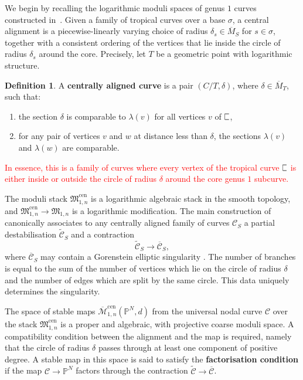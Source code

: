 \documentclass[11pt]{amsart}
\newcommand{\plC}{\scalebox{0.8}[1.3]{$\sqsubset$}}
\newcommand{\tred}{\textcolor{red}}
\renewcommand{\to}{\rightarrow}
\theoremstyle{definition}
\theoremstyle{definition}
\newtheorem{definition}[thm]{Definition}
\begin{document}
We begin by recalling the logarithmic moduli spaces of genus $1$ curves constructed in~\cite[\S\S 2 \& 4]{RSPW}. Given a family of tropical curves over a base $\sigma$, a central alignment is a piecewise-linearly varying choice of radius $\delta_s\in \overline{M}_S$ for $s\in\sigma$, together with a consistent ordering of the vertices that lie inside the circle of radius $\delta_s$ around the core. Precisely, let $T$ be a geometric point with logarithmic structure.

\begin{definition}
A \textbf{centrally aligned curve} is a pair $(C/T,\delta)$, where $\delta\in\overline{M}_T$, such that:
\begin{enumerate}
    \item the section $\delta$ is comparable to $\lambda(v)$ for all vertices $v$ of $\plC$,
    \item for any pair of vertices $v$ and $w$ at distance less than $\delta$, the sections $\lambda(v)$ and $\lambda(w)$ are comparable.
\end{enumerate}
\end{definition}

\tred{In essence, this is a family of curves where every vertex of the tropical curve $\plC$ is either inside or outside the circle of radius $\delta$ around the core genus $1$ subcurve.}

The moduli stack $\mathfrak M_{1,n}^{\mathrm{cen}}$ is a logarithmic algebraic stack in the smooth topology, and $\mathfrak M_{1,n}^{\mathrm{cen}}\to\mathfrak M_{1,n}$ is a logarithmic modification. The main construction of~\cite{RSPW} canonically associates to any centrally aligned family of curves $\mathcal C_S$ a partial destabilisation $\widetilde{\mathcal C}_S$ and a contraction
\[
\widetilde{\mathcal C}_S\to \overline{\mathcal C}_S,
\]
where $\overline{\mathcal C}_S$ may contain a Gorenstein elliptic singularity \cite{SMY1}. The number of branches is equal to the sum of the number of vertices which lie on the circle of radius $\delta$ and the number of edges which are split by the same circle. This data uniquely determines the singularity.

The space of stable maps $\overline{\mathcal M}^{\mathrm{cen}}_{1,n}(\mathbb P^N,d)$ from the universal nodal curve $\mathcal C$ over the stack $\mathfrak M_{1,n}^{\mathrm{cen}}$ is a proper and algebraic, with projective coarse moduli space. A compatibility condition between the alignment and the map is required, namely that the circle of radius $\delta$ passes through at least one component of positive degree. A stable map in this space is said to satisfy the \textbf{factorisation condition} if the map $\mathcal C\to \mathbb P^N$ factors through the contraction $\widetilde{\mathcal C}\to \overline{\mathcal C}$.
\end{document}
